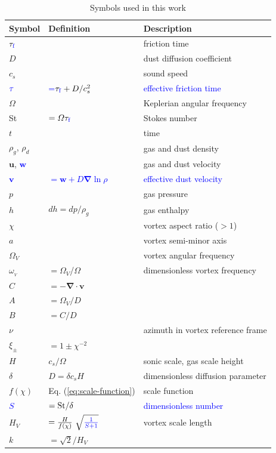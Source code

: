 \documentclass[apj]{emulateapj}
\renewcommand{\v}[1]{{\boldsymbol{#1}}} %
\def\blue#1{\textcolor{blue}{ #1}}
\newcommand{\del}{\v{\nabla}}
\newcommand{\grad}{\del}
\newcommand{\Div}{\del\cdot}
\newcommand{\Eq}[1]{Eq. (\ref{#1})}
\newcommand{\eq}[1]{\Eq{#1}}
\newcommand{\tauf}{\tau_{\rm \blue{f}}}
\newcommand{\St}{{\rm St}}
\begin{document}
\begin{table}
\caption[]{Symbols used in this work}
\label{table:symbols}
\begin{center}
\begin{tabular}{l l l}\hline
Symbol & Definition & Description \\\hline
$\tauf$ && friction time\\
$D$ & & dust diffusion coefficient \\
$c_s$ & & sound speed \\
$\blue{\tau}$ &\blue{=$\tauf + D/c_s^2$}& \blue{effective friction time}\\
$\varOmega$ & & Keplerian angular frequency \\
\St & $= \varOmega \tauf$ & Stokes number \\
$t$ &  & time \\
$\rho_g$, $\rho_d$  & & gas and dust density\\
$\v{u}$, \blue{$\v{w}$} & & gas and dust velocity\\
\blue{$\v{v}$} & \blue{$= \v{w} + D\grad\ln\rho$}& \blue{effective dust velocity} \\
$p$ && gas pressure \\
$h$ &$dh=dp/\rho_g$ & gas enthalpy\\
$\chi$ & & vortex aspect ratio ($>1$) \\
$a$ & & vortex semi-minor axis \\
$\varOmega_V$ & & vortex angular frequency \\
$\omega_{_V}$ &  $=\varOmega_V$/$\varOmega$ & dimensionless vortex frequency  \\
$C$ & $=-\Div{\v{v}}$ &  \\
$A$ & $=\varOmega_V/D$ & \\
$B$  &$=C/D$ & \\
$\nu$ & & azimuth in vortex reference frame\\
$\xi_\pm$ & $ = 1\pm\chi^{-2}$ \\
$H$ & $c_s/\varOmega$ & sonic scale, gas scale height\\
$\delta$ & $D=\delta c_s H$ & dimensionless diffusion parameter\\
$f(\chi)$ & \eq{eq:scale-function} & scale function \\
\blue{$S$} & \blue{$= \St/\delta$} & \blue{dimensionless number} \\
$H_V$ & $=\frac{H}{f(\chi)} \ \sqrt{\blue{\frac{1}{S+1}}}$ & vortex scale length \\
$k$ & $=\sqrt{2}/H_V$ & \\ 

\end{tabular}
\end{center}
\end{table}
\end{document}
